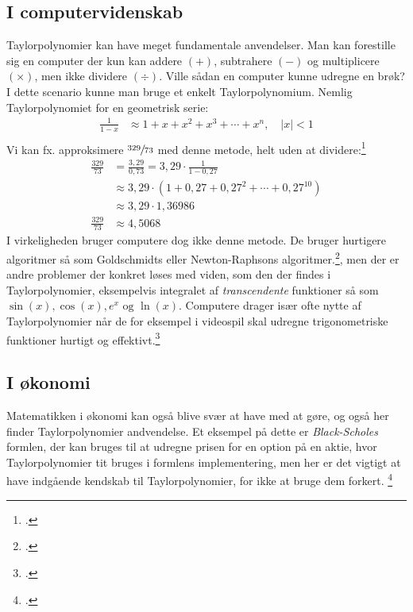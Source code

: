 \documentclass[12pt, a4paper]{article}
\begin{document}
\begin{refsection}
\subsection{I computervidenskab}
Taylorpolynomier kan have meget fundamentale anvendelser. Man kan forestille sig en computer der kun kan addere $(+)$, subtrahere $(-)$ og multiplicere $(\times)$, men ikke dividere $(\div)$. Ville sådan en computer kunne udregne en brøk?\\
I dette scenario kunne man bruge et enkelt Taylorpolynomium. Nemlig Taylorpolynomiet for en geometrisk serie:
\begin{equation*}
    \begin{aligned}
        \frac{1}{1-x}&\approx 1+x+x^2+x^3+\cdots+x^n, \quad |x|<1\\
    \end{aligned}
\end{equation*}
Vi kan fx. approksimere $\sfrac{329}{73}$ med denne metode, helt uden at dividere:\footcite[s. 646]{calculuswithanalyticgeometry}\\
\begin{equation*}
    \begin{aligned}
        \frac{329}{73}&=\frac{3{,}29}{0{,}73}=3{,}29\cdot\frac{1}{1-0{,}27}\\
                      &\approx 3{,}29\cdot\left(1+0{,}27+0{,}27^2+\cdots+0{,}27^{10}\right)\\
                      &\approx3{,}29\cdot1{,}36986\\
        \frac{329}{73}&\approx 4{,}5068
    \end{aligned}
\end{equation*}
I virkeligheden bruger computere dog ikke denne metode. De bruger hurtigere algoritmer så som Goldschmidts eller Newton-Raphsons algoritmer.\footcite{division}, men der er andre problemer der konkret løses med viden, som den der findes i Taylorpolynomier, eksempelvis integralet af \textit{transcendente} funktioner så som $\sin(x), \cos(x), e^x \text{ og } \ln(x)$. Computere drager især ofte nytte af Taylorpolynomier når de for eksempel i videospil skal udregne trigonometriske funktioner hurtigt og effektivt.\footcite[11]{hvadermatematik}
\subsection{I økonomi}
Matematikken i økonomi kan også blive svær at have med at gøre, og også her finder Taylorpolynomier andvendelse. Et eksempel på dette er \textit{Black-Scholes} formlen, der kan bruges til at udregne prisen for en option på en aktie, hvor Taylorpolynomier tit bruges i formlens implementering, men her er det vigtigt at have indgående kendskab til Taylorpolynomier, for ikke at bruge dem forkert. \footcite{aktier}

\end{refsection}
\end{document}
